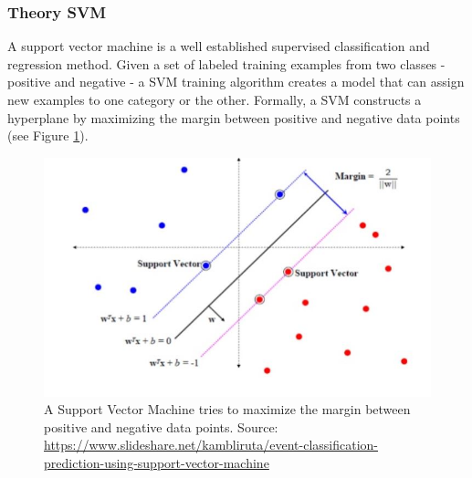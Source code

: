\documentclass[12pt,a4paper,bibliography=totocnumbered,listof=totocnumbered]{scrartcl}
\begin{document}
\subsubsection{Theory SVM}
A support vector machine is a well established supervised classification and regression method. Given a set of labeled training examples from two classes - positive and negative - a SVM training algorithm creates a model that can assign new examples to one category or the other. Formally, a SVM constructs a hyperplane by maximizing the margin between positive and negative data points (see Figure \ref{fig:svm}).  

\begin{figure}[H]
\centering
  \includegraphics[width=0.7\linewidth]{svm.jpg}
  \caption{A Support Vector Machine tries to maximize the margin between positive and negative data points. Source: \url{https://www.slideshare.net/kambliruta/event-classification-prediction-using-support-vector-machine}}
  \label{fig:svm}
\end{figure}
\end{document}

